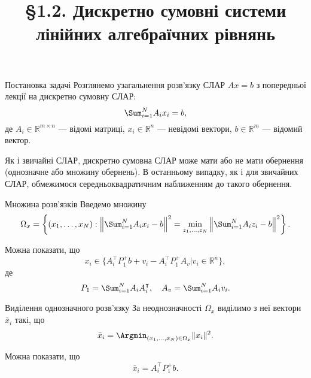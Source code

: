 \title[Дискретно сумовні СЛАР]
{\S1.2. Дискретно сумовні системи \\ лінійних алгебраїчних рівнянь}

\begin{frame}
    \titlepage
\end{frame}

\begin{mframe}{Постановка задачі}
    Розглянемо узагальнення розв'язку СЛАР $A x = b$ з попередньої лекції на
    дискретно сумовну СЛАР:
    \begin{equation}
        \label{eq:1.9}
        \Sum_{i = 1}^N A_i x_i = b,
    \end{equation}
    де $A_i \in \mathbb{R}^{m \times n}$ --- відомі матриці,
    $x_i \in \mathbb{R}^n$ --- невідомі вектори, $b \in \mathbb{R}^m$ ---
    відомий вектор. \medskip
    
    Як і звичайні СЛАР, дискретно сумовна СЛАР може мати або не мати обернення
    (однозначне або множину обернень). В останньому випадку, як і для звичайних
    СЛАР, обмежимося середньоквадратичним наближенням до такого обернення.
\end{mframe}

\begin{mframe}{Множина розв'язків}
    Введемо множину
    \begin{equation}
        \label{eq:1.10}
        \Omega_x = \left\{ (x_1, \ldots, x_N): 
        \left\| \Sum_{i = 1}^N A_i x_i - b \right\|^2 = \min_{z_1, \ldots, z_N}
        \left\| \Sum_{i = 1}^N A_i z_i - b \right\|^2 \right\}.
    \end{equation}
    
    Можна показати, що
    \begin{equation}
        \label{eq:1.12}
        x_i \in \Big\{ A_i^\intercal P_1^+ b + v_i - A_i^\intercal P_1^+ A_v 
        \Big| v_i \in \mathbb{R}^n \Big\},
    \end{equation}
    де
    \begin{equation*}
        P_1 = \Sum_{i = 1}^N A_i A_i^\intercal, \quad A_v = 
        \Sum_{i = 1}^N A_i v_i.
    \end{equation*}
\end{mframe}

\begin{mframe}{Виділення однозначного розв'язку}
    За неоднозначності $\Omega_x$ виділимо з неї вектори $\bar x_i$ такі, що
    \begin{equation}
        \label{eq:1.11}
        \bar x_i = \Argmin_{(x_1, \ldots, x_N) \in \Omega_x} \|x_i\|^2.
    \end{equation}
    
    Можна показати, що
    \begin{equation}
        \label{eq:1.14}
        \bar x_i = A_i^\intercal P_1^+ b.
    \end{equation}
\end{mframe}

